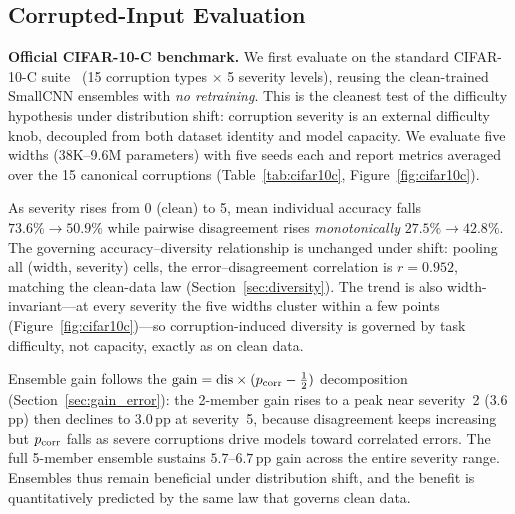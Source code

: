 \documentclass[11pt]{article}
\begin{document}
\subsection{Corrupted-Input Evaluation}
\label{sec:corrupted}

\textbf{Official CIFAR-10-C benchmark.}  We first evaluate on the standard
CIFAR-10-C suite~\citep{hendrycks2019robustness} (15 corruption types
$\times$ 5 severity levels), reusing the clean-trained SmallCNN ensembles with
\emph{no retraining}.  This is the cleanest test of the difficulty hypothesis
under distribution shift: corruption severity is an external difficulty knob,
decoupled from both dataset identity and model capacity.  We evaluate five
widths (38K--9.6M parameters) with five seeds each and report metrics averaged
over the 15 canonical corruptions (Table~\ref{tab:cifar10c},
Figure~\ref{fig:cifar10c}).

As severity rises from 0 (clean) to 5, mean individual accuracy falls
$73.6\% \to 50.9\%$ while pairwise disagreement rises \emph{monotonically}
$27.5\% \to 42.8\%$.  The governing accuracy--diversity relationship is
unchanged under shift: pooling all (width, severity) cells, the
error--disagreement correlation is $r = 0.952$, matching the clean-data law
(Section~\ref{sec:diversity}).  The trend is also width-invariant---at every
severity the five widths cluster within a few points
(Figure~\ref{fig:cifar10c})---so corruption-induced diversity is governed by
task difficulty, not capacity, exactly as on clean data.

Ensemble gain follows the $\mathrm{gain}=\mathrm{dis}\times(p_{\rm corr}-\tfrac12)$
decomposition (Section~\ref{sec:gain_error}): the 2-member gain rises to a peak
near severity~2 ($3.6$\,pp) then declines to $3.0$\,pp at severity~5, because
disagreement keeps increasing but $p_{\rm corr}$ falls as severe corruptions
drive models toward correlated errors.  The full 5-member ensemble sustains
$5.7$--$6.7$\,pp gain across the entire severity range.  Ensembles thus remain
beneficial under distribution shift, and the benefit is quantitatively
predicted by the same law that governs clean data.
\end{document}

